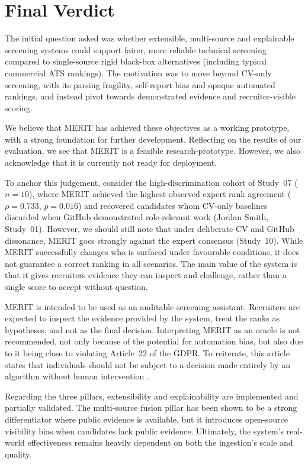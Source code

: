 \section{Final Verdict}
\label{sec:final-verdict}

The initial question asked was whether extensible, multi-source and explainable screening systems could support fairer, more reliable technical
screening compared to single-source rigid black-box alternatives (including typical commercial ATS rankings).
The motivation was to move beyond CV-only screening, with its parsing fragility, self-report bias and opaque automated rankings, and instead
pivot towards demonstrated evidence and recruiter-visible scoring.

We believe that MERIT has achieved these objectives as a working prototype, with a strong foundation for further development. Reflecting on the
results of our evaluation, we see that MERIT is a feasible research-prototype. However, we also acknowledge that it is currently not ready for 
deployment. 

To anchor this judgement, consider the high-discrimination cohort of Study~07 ($n=10$), where MERIT achieved the highest observed expert rank agreement
($\rho = 0.733$, $p = 0.016$) and recovered candidates whom CV-only baselines discarded when GitHub demonstrated role-relevant work (Jordan Smith, Study~01).
However, we should still note that under deliberate CV and GitHub dissonance, MERIT goes strongly against the expert consensus (Study~10).
While MERIT successfully changes who is surfaced under favourable conditions, it does not guarantee a correct ranking in all scenarios.
The main value of the system is that it gives recruiters evidence they can inspect and challenge, rather than a single score to accept without question.

MERIT is intended to be used as an auditable screening assistant. Recruiters are expected to inspect the evidence provided by the system, treat the 
ranks as hypotheses, and not as the final decision. Interpreting MERIT as an oracle is not recommended, not only because of the potential for automation
bias, but also due to it being close to violating Article~22 of the GDPR. To reiterate, this article states that individuals should not be subject to a decision
made entirely by an algorithm without human intervention \cite{eu_gdpr_2016}.

Regarding the three pillars, extensibility and explainability are implemented and partially validated. The multi-source fusion pillar has been shown 
to be a strong differentiator where public evidence is available, but it introduces open-source visibility bias when candidates lack public evidence.
Ultimately, the system's real-world effectiveness remains heavily dependent on both the ingestion's scale and quality.

